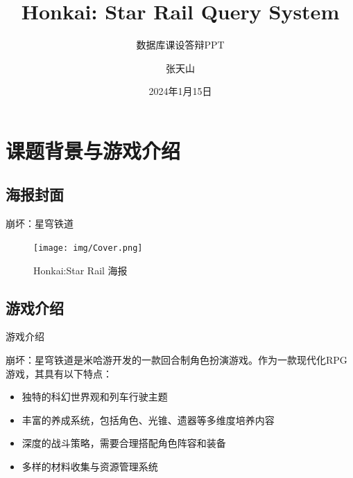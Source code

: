 \documentclass{beamer}
\author{张天山}
\title{Honkai: Star Rail Query System}
\subtitle{数据库课设答辩PPT}
\institute{R成型221-29}
\date{2024年1月15日}
\begin{document}
\kaishu
\begin{frame}
    \titlepage
    \begin{figure}[htpb]
        \begin{center}
        \end{center}
    \end{figure}
\end{frame}

\begin{frame}
    \tableofcontents[sectionstyle=show,subsectionstyle=show/shaded/hide,subsubsectionstyle=show/shaded/hide]
\end{frame}


\section{课题背景与游戏介绍}

\subsection{海报封面}

\begin{frame}{崩坏：星穹铁道}
    \begin{figure}   
        \centering
        \texttt{[image: img/Cover.png]} 
        \caption{Honkai:Star Rail 海报\cite{hoyoverse2023honkai}}
        \label{Forward and Reverse Process}
    \end{figure}
\end{frame}



\subsection{游戏介绍}
\begin{frame}{游戏介绍}
    
    崩坏：星穹铁道是米哈游开发的一款回合制角色扮演游戏。作为一款现代化RPG游戏，其具有以下特点：
    \begin{itemize}
        \item 独特的科幻世界观和列车行驶主题
        \item 丰富的养成系统，包括角色、光锥、遗器等多维度培养内容
        \item 深度的战斗策略，需要合理搭配角色阵容和装备
        \item 多样的材料收集与资源管理系统
    \end{itemize}

\end{frame}
\end{document}
